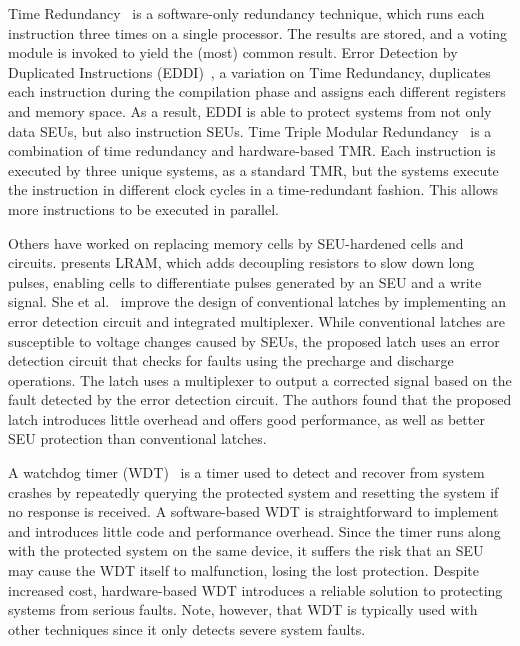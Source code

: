 Time Redundancy~\cite{ulta2013} is a software-only redundancy technique, which runs each instruction three times on a single processor. The results are stored, and a voting module is invoked to yield the (most) common result. Error Detection by Duplicated Instructions (EDDI)~\cite{oh2002error}, a variation on Time Redundancy, duplicates each instruction during the compilation phase and assigns each different registers and memory space. As a result, EDDI is able to protect systems from not only data SEUs, but also instruction SEUs. Time Triple Modular Redundancy~\cite{ulta2013} is a combination of time redundancy and hardware-based TMR. Each instruction is executed by three unique systems, as a standard TMR, but the systems execute the instruction in different clock cycles in a time-redundant fashion. This allows more instructions to be executed in parallel.

Others have worked on replacing memory cells by SEU-hardened cells and circuits. \cite{weaver1987seu} presents LRAM, which adds decoupling resistors to slow down long pulses, enabling cells to differentiate pulses generated by an SEU and a write signal. She et al.~\cite{She2012Latch} improve the design of conventional latches by implementing an error detection circuit and integrated multiplexer. While conventional latches are susceptible to voltage changes caused by SEUs, the proposed latch uses an error detection circuit that checks for faults using the precharge and discharge operations. The latch uses a multiplexer to output a corrected signal based on the fault detected by the error detection circuit. The authors found that the proposed latch introduces little overhead and offers good performance, as well as better SEU protection than conventional latches.

A watchdog timer (WDT)~\cite{huang1986watchdog} is a timer used to detect and recover from system crashes by repeatedly querying the protected system and resetting the system if no response is received. A software-based WDT is straightforward to implement and introduces little code and performance overhead. Since the timer runs along with the protected system on the same device, it suffers the risk that an SEU may cause the WDT itself to malfunction, losing the lost protection. Despite increased cost, hardware-based WDT introduces a reliable solution to protecting systems from serious faults. Note, however, that WDT is typically used with other techniques since it only detects severe system faults.

